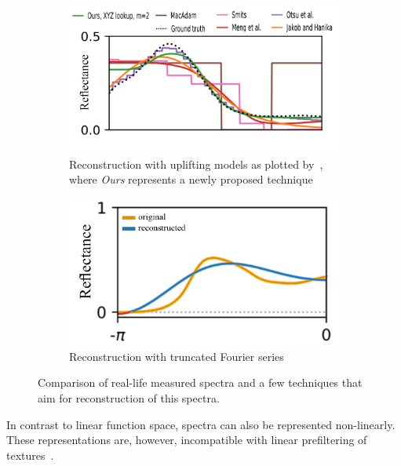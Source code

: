 \begin{figure}[t]
	\centering
	\begin{subfigure}[t]{0.45\textwidth}
		\includegraphics[width=\linewidth]{img/spectra_rec_method_comparison.png}
		\caption{Reconstruction with uplifting models as plotted by~\citet{trigonometricMomentsPaper}, where \emph{Ours} represents a newly proposed technique}
		\label{fig:specRecUpliftingMethods}
	\end{subfigure} \hspace{0.1em}
	\begin{subfigure}[t]{0.45\textwidth}
		\includegraphics[width=\linewidth]{img/spectra_rec_truncated_fourier.png}
		\caption{Reconstruction with truncated Fourier series~\cite{trigonometricMomentsPresentation}}
		\label{fig:specRecTruncatedFourier}
	\end{subfigure}
	\caption{Comparison of real-life measured spectra and a few techniques that aim for reconstruction of this spectra.}
	\label{fig:spectraReconstruction}
\end{figure}

In contrast to linear function space, spectra can also be represented non-linearly. These representations are, however, incompatible with linear prefiltering of textures~\cite{trigonometricMomentsPaper}.


